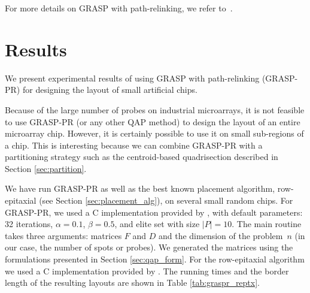 \documentclass[english]{lni}
\begin{document}
For more details on GRASP with path-relinking, we refer to~\cite{OLIVEIRA04}.

\section{Results}
\label{sec:results}

We present experimental results of using GRASP with path-relinking (GRASP-PR)
for designing the layout of small artificial chips.

Because of the large number of probes on industrial microarrays, it is not
feasible to use GRASP-PR (or any other QAP method) to design the layout of an
entire microarray chip. However, it is certainly possible to use it on small
sub-regions of a chip. This is interesting because we can combine GRASP-PR
with a partitioning strategy such as the centroid-based quadrisection
described in Section \ref{sec:partition}.

We have run GRASP-PR as well as the best known placement algorithm,
row-epitaxial (see Section \ref{sec:placement_alg}), on several small random
chips. For GRASP-PR, we used a C implementation provided by
\cite{OLIVEIRA04}, with default parameters: 32 iterations, $\alpha=0.1$,
$\beta=0.5$, and elite set with size $|P|=10$. The main routine takes
three arguments: matrices $F$ and $D$ and the dimension of the problem~$n$ (in
our case, the number of spots or probes). We generated the matrices using the
formulations presented in Section \ref{sec:qap_form}. For the row-epitaxial
algorithm we used a C implementation provided by \cite{KAHNG03A}. The
running times and the border length of the resulting layouts are shown in
Table \ref{tab:graspr_reptx}.
\end{document}
